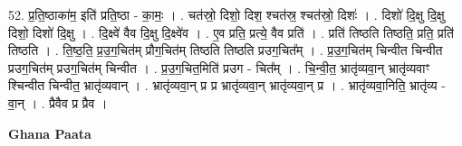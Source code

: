 \documentclass[17pt]{extarticle}
\begin{document}
52. प्र॒ति॒ष्ठाका॑म॒ इति॑ प्रति॒ष्ठा - का॒मः॒ । . चत॑स्रो॒ दिशो॒ दिश॒ श्चत॑स्र॒ श्चत॑स्रो॒ दिशः॑ । . दिशो॑ दि॒क्षु दि॒क्षु दिशो॒ दिशो॑ दि॒क्षु । . दि॒क्ष्वे॑ वैव दि॒क्षु दि॒क्ष्वे॑व । . ए॒व प्रति॒ प्रत्ये॒ वैव प्रति॑ । . प्रति॑ तिष्ठति तिष्ठति॒ प्रति॒ प्रति॑ तिष्ठति । . ति॒ष्ठ॒ति॒ प्र॒उ॒ग॒चित॑म् प्रौग॒चित॑म् तिष्ठति तिष्ठति प्र‌उग॒चित᳚म् । . प्र॒उ॒ग॒चित॑म् चिन्वीत चिन्वीत प्र‌उग॒चित॑म् प्र‌उग॒चित॑म् चिन्वीत । . प्र॒उ॒ग॒चित॒मिति॑ प्र‌उग - चित᳚म् । . चि॒न्वी॒त॒ भ्रातृ॑व्यवा॒न् भ्रातृ॑व्यवाꣳ श्चिन्वीत चिन्वीत॒ भ्रातृ॑व्यवान् । . भ्रातृ॑व्यवा॒न् प्र प्र भ्रातृ॑व्यवा॒न् भ्रातृ॑व्यवा॒न् प्र । . भ्रातृ॑व्यवा॒निति॒ भ्रातृ॑व्य - वा॒न् । . प्रैवैव प्र प्रैव । \newline

\textbf{Ghana Paata } \newline
\end{document}
